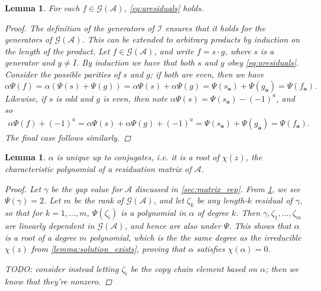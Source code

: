 \documentclass[12pt, letterpaper]{article}
\newcommand{\A}{\mathcal A}
\newcommand{\ch}[1]{\mathbf{#1}}
\newcommand{\res}[2]{{{#1}_{\ch{#2}}}}
\newcommand{\I}{\mathcal I}
\newcommand{\gp}{\mathcal G}
\newcommand{\f}[1]{\overline{#1}}
\newtheorem{lemma}[thm]{Lemma}
\begin{document}
\begin{lemma}\label{lemma:residuation}
    For each $f \in \gp(\A)$, \cref{eq:aresiduals} holds.
    \begin{proof}
        The definition of the generators of $\I$ ensures that it holds for the
        generators of $\gp(\A)$. This can be extended to arbitrary products by
        induction on the length of the product. Let $f \in \gp(\A)$, and write
        $f = s \cdot g$, where $s$ is a generator and $g \ne I$. By induction
        we have that both $s$ and $g$ obey \cref{eq:aresiduals}.  Consider the
        possible parities of $s$ and $g$; if both are even, then we have
        \[
            \alpha \Psi(f) =
            \alpha (\Psi(s) + \Psi(g)) =
            \alpha \Psi(s) + \alpha \Psi(g) =
            \Psi(\res{s}{a}) + \Psi(\res{g}{a}) = \Psi(\res{f}{a}).
        \]
        Likewise, if $s$ is odd and $g$ is even, then note $\alpha \Psi(s) =
        \Psi(\res{s}{a}) - (-1)^a$, and so
        \begin{align*}
            \alpha \Psi(f) + (-1)^a =
            \alpha \Psi(s) + \alpha \Psi(g) + (-1)^a =
            \Psi(\res{s}{a}) + \Psi(\res{g}{\f{a}}) =
            \Psi(\res{f}{a}).
        \end{align*}
        The final case follows similarly.
    \end{proof}
\end{lemma}


\begin{lemma}\label{lemma:a_unique}
    $\alpha$ is unique up to conjugates, i.e. it is a root of $\chi(z)$, the
    characteristic polynomial of a residuation matrix of $\A$.
    \begin{proof}
        Let $\gamma$ be the gap value for $\A$ discussed in
        \cref{sec:matrix_rep}. From \cref{lemma:residuation}, we see
        $\Psi(\gamma) = 2$. Let $m$ be the rank of $\gp(\A)$, and let
        $\zeta_k$ be any length-$k$ residual of $\gamma$, so that for
        $k = 1, \ldots, m$, $\Psi(\zeta_i)$ is a polynomial in $\alpha$ of
        degree $k$. Then $\gamma, \zeta_1, \ldots, \zeta_{m}$ are linearly
        dependent in $\gp(\A)$, and hence are also under $\Psi$. This shows
        that $\alpha$ is a root of a degree $m$ polynomial, which is the
        the same degree as the irreducible $\chi(z)$ from
        \cref{lemma:solution_exists}, proving that $\alpha$ satisfies
        $\chi(\alpha) = 0$.

        TODO: consider instead letting $\zeta_i$ be the copy chain element
        based on $\alpha$; then we know that they're nonzero.
    \end{proof}
\end{lemma}
\end{document}
